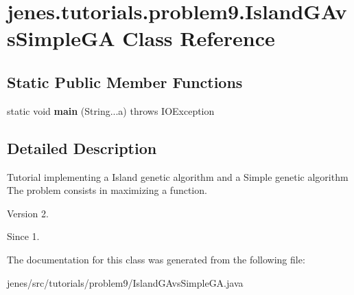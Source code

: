 \hypertarget{classjenes_1_1tutorials_1_1problem9_1_1_island_g_avs_simple_g_a}{\section{jenes.\-tutorials.\-problem9.\-Island\-G\-Avs\-Simple\-G\-A Class Reference}
\label{classjenes_1_1tutorials_1_1problem9_1_1_island_g_avs_simple_g_a}
}
\subsection*{Static Public Member Functions}
\begin{DoxyCompactItemize}
\item 
\hypertarget{classjenes_1_1tutorials_1_1problem9_1_1_island_g_avs_simple_g_a_a20124a96736560ad40f38c5cf057c8df}{static void {\bfseries main} (String...\-a)  throws I\-O\-Exception }\label{classjenes_1_1tutorials_1_1problem9_1_1_island_g_avs_simple_g_a_a20124a96736560ad40f38c5cf057c8df}

\end{DoxyCompactItemize}


\subsection{Detailed Description}
Tutorial implementing a Island genetic algorithm and a Simple genetic algorithm The problem consists in maximizing a function.

\begin{DoxyVersion}{Version}
2. 
\end{DoxyVersion}
\begin{DoxySince}{Since}
1. 
\end{DoxySince}


The documentation for this class was generated from the following file\-:\begin{DoxyCompactItemize}
\item 
jenes/src/tutorials/problem9/Island\-G\-Avs\-Simple\-G\-A.\-java\end{DoxyCompactItemize}
